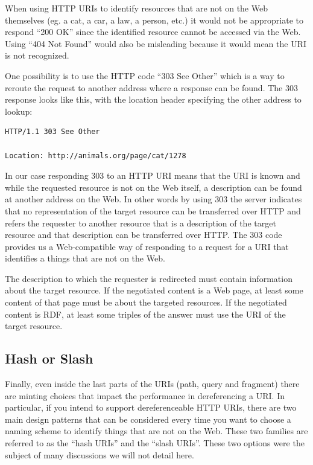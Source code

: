 When using HTTP URIs to identify resources that are not on the Web
themselves (eg. a cat, a car, a law, a person, etc.) it would not be
appropriate to respond ``200 OK'' since the identified resource cannot
be accessed via the Web. Using ``404 Not Found'' would also be
misleading because it would mean the URI is not recognized.

One possibility is to use the HTTP code ``303 See Other'' which is a way
to reroute the request to another address where a response can be found.
The 303 response looks like this, with the location header specifying
the other address to lookup:

\begin{lstlisting}
HTTP/1.1 303 See Other

Location: http://animals.org/page/cat/1278
\end{lstlisting}


In our case responding 303 to an HTTP URI means that the URI is known
and while the requested resource is not on the Web itself, a description
can be found at another address on the Web. In other words by using 303
the server indicates that no representation of the target resource can
be transferred over HTTP and refers the requester to another resource
that is a description of the target resource and that description can be
transferred over HTTP. The 303 code provides us a Web-compatible way of
responding to a request for a URI that identifies a things that are not
on the Web.

The description to which the requester is redirected must contain
information about the target resource. If the negotiated content is a
Web page, at least some content of that page must be about the targeted
resources. If the negotiated content is RDF, at least some triples of
the answer must use the URI of the target resource.

\hypertarget{hash-or-slash}{%
\subsection{Hash or Slash}\label{hash-or-slash}}

Finally, even inside the last parts of the URIs (path, query and
fragment) there are minting choices that impact the performance in
dereferencing a URI. In particular, if you intend to support
dereferenceable HTTP URIs, there are two main design patterns that can
be considered every time you want to choose a naming scheme to identify
things that are not on the Web. These two families are referred to as
the ``hash URIs'' and the ``slash URIs''. These two options were the
subject of many discussions we will not detail here.

